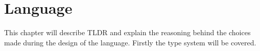 \chapter{Language}\label{part:design}

This chapter will describe TLDR and explain the reasoning behind the choices made during the design of the language. Firstly the type system will be covered.












%